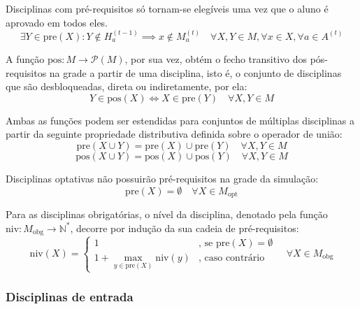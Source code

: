 \documentclass[
    12pt,
    openany,
    oneside,
    a4paper,
    english,
    brazil
]{abntex2}
\begin{document}
Disciplinas com pré-requisitos só tornam-se elegíveis uma vez que o aluno é aprovado em todos eles.
\begin{equation}
    \exists Y \in \mathrm{pre}(X) : Y \notin H^{(t - 1)}_a
    \implies x \notin M_a^{(t)}
    \quad \forall X, Y \in M, \forall x \in X, \forall a \in A^{(t)}
\end{equation}

A função $\mathrm{pos}: M \xrightarrow{} \mathcal{P}(M)$, por sua vez, obtém o fecho transitivo dos pós-requisitos na grade a partir de uma disciplina, isto é, o conjunto de disciplinas que são desbloqueadas, direta ou indiretamente, por ela:
\begin{equation}
    Y \in \mathrm{pos}(X) \iff X \in \mathrm{pre}(Y)
    \quad \forall X, Y \in M
\end{equation}

Ambas as funções podem ser estendidas para conjuntos de múltiplas disciplinas a partir da seguinte propriedade distributiva definida sobre o operador de união:
\begin{equation}
    \mathrm{pre}(X \cup Y) = \mathrm{pre}(X) \cup \mathrm{pre}(Y)
    \quad \forall X, Y \in M
\end{equation}
\begin{equation}
    \mathrm{pos}(X \cup Y) = \mathrm{pos}(X) \cup \mathrm{pos}(Y)
    \quad \forall X, Y \in M
\end{equation}

Disciplinas optativas não possuirão pré-requisitos na grade da simulação:
\begin{equation}
    \mathrm{pre}(X) = \emptyset \quad \forall X \in M_\text{opt} 
\end{equation}

Para as disciplinas obrigatórias, o nível da disciplina, denotado pela função $\mathrm{niv}: M_\text{obg} \xrightarrow{} \mathbb{N}^*$, decorre por indução da sua cadeia de pré-requisitos:
\begin{equation} \label{eq:periodo-disciplina}
    \mathrm{niv}(X) =
    \begin{cases}
        1 & \text{, se } \mathrm{pre}(X) = \emptyset \\
        1 + \max_{y \in \mathrm{pre}(X)} \mathrm{niv}(y) & \text{, caso contrário}
    \end{cases}
    \quad
    \forall X \in M_\text{obg}
\end{equation}

\subsubsection{Disciplinas de entrada}
\end{document}
